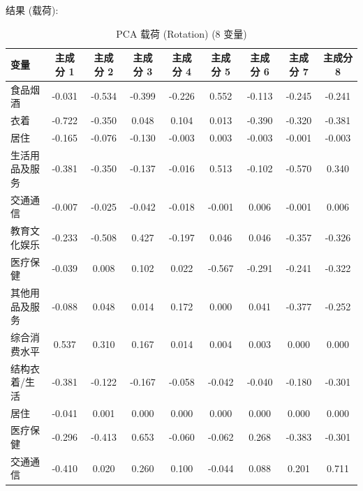 \documentclass[12pt, a4paper]{article}
\begin{document}
\noindent 结果 (载荷):
\begin{table}[H]
    \centering
    \caption{PCA 载荷 (Rotation) (8 变量)}
    \label{tab:pca_loadings_rotated}
    \begin{tabularx}{\textwidth}{X|*{8}{c}} %
        \toprule
        \textbf{变量} & \textbf{主成分 1} & \textbf{主成分 2} & \textbf{主成分 3} & \textbf{主成分 4} & \textbf{主成分 5} & \textbf{主成分 6} & \textbf{主成分 7} & \textbf{主成分 8} \\
        \midrule
        食品烟酒 & -0.031 & -0.534 & -0.399 & -0.226 & 0.552 & -0.113 & -0.245 & -0.241 \\
        衣着 & -0.722 & -0.350 & 0.048 & 0.104 & 0.013 & -0.390 & -0.320 & -0.381 \\
        居住 & -0.165 & -0.076 & -0.130 & -0.003 & 0.003 & -0.003 & -0.001 & -0.003 \\
        生活用品及服务 & -0.381 & -0.350 & -0.137 & -0.016 & 0.513 & -0.102 & -0.570 & 0.340 \\
        交通通信 & -0.007 & -0.025 & -0.042 & -0.018 & -0.001 & 0.006 & -0.001 & 0.006 \\
        教育文化娱乐 & -0.233 & -0.508 & 0.427 & -0.197 & 0.046 & 0.046 & -0.357 & -0.326 \\
        医疗保健 & -0.039 & 0.008 & 0.102 & 0.022 & -0.567 & -0.291 & -0.241 & -0.322 \\
        其他用品及服务 & -0.088 & 0.048 & 0.014 & 0.172 & 0.000 & 0.041 & -0.377 & -0.252 \\
        \midrule %
        综合消费水平 & 0.537 & 0.310 & 0.167 & 0.014 & 0.004 & 0.003 & 0.000 & 0.000 \\
        结构衣着/生活 & -0.381 & -0.122 & -0.167 & -0.058 & -0.042 & -0.040 & -0.180 & -0.301 \\
        居住 & -0.041 & 0.001 & 0.000 & 0.000 & 0.000 & 0.000 & 0.000 & 0.000 \\
        医疗保健 & -0.296 & -0.413 & 0.653 & -0.060 & -0.062 & 0.268 & -0.383 & -0.301 \\
        交通通信 & -0.410 & 0.020 & 0.260 & 0.100 & -0.044 & 0.088 & 0.201 & 0.711 \\
        \bottomrule
    \end{tabularx}
\end{table}
\end{document}
